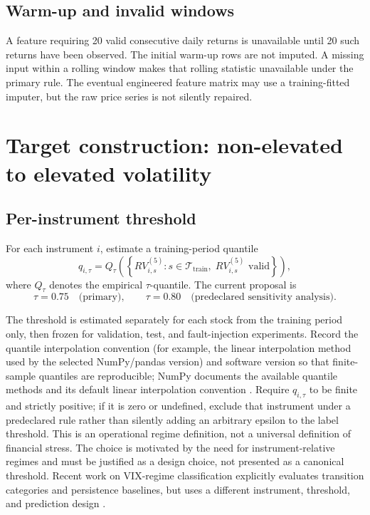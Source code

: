 \documentclass[11pt,a4paper]{article}
\newcommand{\train}{\mathcal{T}_{\mathrm{train}}}
\begin{document}
\subsection{Warm-up and invalid windows}

A feature requiring 20 valid consecutive daily returns is unavailable until 20 such returns have been observed. The initial warm-up rows are not imputed. A missing input within a rolling window makes that rolling statistic unavailable under the primary rule. The eventual engineered feature matrix may use a training-fitted imputer, but the raw price series is not silently repaired.

\section{Target construction: non-elevated to elevated volatility}
\label{sec:target}

\subsection{Per-instrument threshold}

For each instrument $i$, estimate a training-period quantile
\begin{equation}
  q_{i,\tau}=Q_{\tau}\!\left(
  \left\{RV_{i,s}^{(5)}:s\in\train,\; RV_{i,s}^{(5)}\text{ valid}\right\}
  \right),
  \label{eq:threshold}
\end{equation}
where $Q_{\tau}$ denotes the empirical $\tau$-quantile. The current proposal is
\begin{equation}
  \tau=0.75\quad\text{(primary)},\qquad
  \tau=0.80\quad\text{(predeclared sensitivity analysis)}.
\end{equation}

The threshold is estimated separately for each stock from the training period only, then frozen for validation, test, and fault-injection experiments. Record the quantile interpolation convention (for example, the linear interpolation method used by the selected NumPy/pandas version) and software version so that finite-sample quantiles are reproducible; NumPy documents the available quantile methods and its default linear interpolation convention \cite{NumPyQuantileDocs}. Require $q_{i,\tau}$ to be finite and strictly positive; if it is zero or undefined, exclude that instrument under a predeclared rule rather than silently adding an arbitrary epsilon to the label threshold. This is an operational regime definition, not a universal definition of financial stress. The choice is motivated by the need for instrument-relative regimes and must be justified as a design choice, not presented as a canonical threshold. Recent work on VIX-regime classification explicitly evaluates transition categories and persistence baselines, but uses a different instrument, threshold, and prediction design \cite{GuptaLiu2026}.
\end{document}
